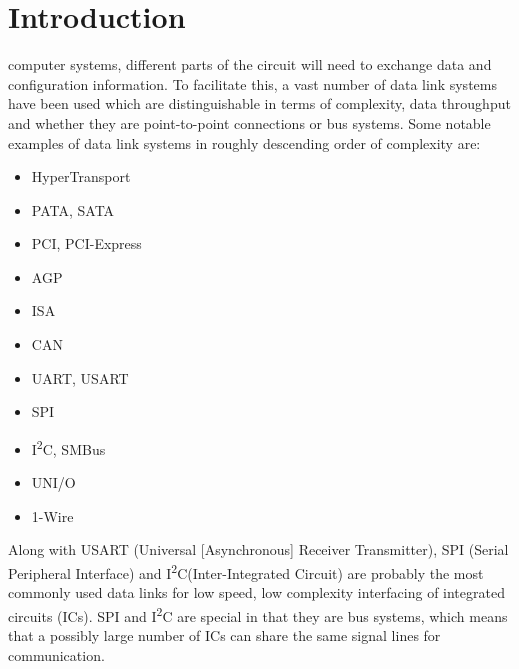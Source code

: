 \documentclass[journal]{IEEEtran}
\newcommand{\twi}{I\textsuperscript{2}C\xspace}
\begin{document}
%
\IEEEpeerreviewmaketitle



\section{Introduction}
% 
% 
% 
% 
 computer systems, different parts of the circuit will need to exchange data and configuration information. To facilitate this, a vast number of data link systems have been used which are distinguishable in terms of complexity, data throughput and whether they are point-to-point connections or bus systems.
Some notable examples of data link systems in roughly descending order of complexity are:
\renewcommand{\labelitemi}{$-$}
\begin{itemize}
		\item HyperTransport
		\item PATA, SATA
		\item PCI, PCI-Express
		\item AGP
		\item ISA
		\item CAN
		\item UART, USART
		\item SPI
		\item \twi, SMBus
		\item UNI/O
		\item 1-Wire
\end{itemize}
\IEEEPARstart{}{}Along with USART (Universal [Asynchronous] Receiver Transmitter), SPI (Serial Peripheral Interface) and \twi (Inter-Integrated Circuit) are probably the most commonly used data links for low speed, low complexity interfacing of integrated circuits (ICs). SPI and \twi are special in that they are bus systems, which means that a possibly large number of ICs can share the same signal lines for communication.
\end{document}
